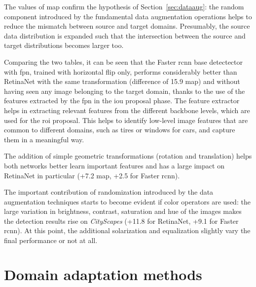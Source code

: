 \documentclass[%
    corpo=12pt,
    twoside,
    stile=classica,   
    tipotesi=magistrale,
    evenboxes,
    english,
	numerazioneromana,
]{toptesi}
\begin{document}
\bigskip
The values of \gls{map} confirm the hypothesis of Section~\ref{sec:dataaug}: the random component introduced by the fundamental data augmentation operations helps to reduce the mismatch between source and target domains. Presumably, the source data distribution is expanded such that the intersection between the source and target distributions becomes larger too.

Comparing the two tables, it can be seen that the Faster \gls{rcnn} base detectector with \gls{fpn}, trained with horizontal flip only, performs considerably better than RetinaNet with the same transformation (difference of 15.9 \gls{map}) and without having seen any image belonging to the target domain, thanks to the use of the features extracted by the \gls{fpn} in the \gls{iou} proposal phase. The feature extractor helps in extracting relevant features from the different backbone levels, which are used for the \gls{roi} proposal. This helps to identify low-level image features that are common to different domains, such as tires or windows for cars, and capture them in a meaningful way.

The addition of simple geometric transformations (rotation and translation) helps both networks better learn important features and has a large impact on RetinaNet in particular (+7.2 \gls{map}, +2.5 for Faster \gls{rcnn}).

The important contribution of randomization introduced by the data augmentation techniques starts to become evident if color operators are used: the large variation in brightness, contrast, saturation and hue of the images makes the detection results rise on \textit{CityScapes} (+11.8 for RetinaNet, +9.1 for Faster \gls{rcnn}). At this point, the additional solarization and equalization slightly vary the final performance or not at all.

\section{Domain adaptation methods}
\end{document}
